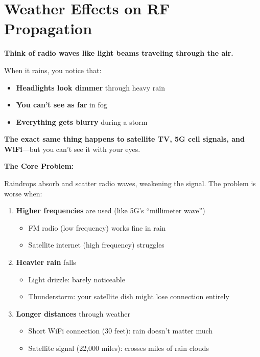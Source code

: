 \chapter{Weather Effects on RF Propagation}
\label{ch:weather-effects}

\begin{nontechnical}
\textbf{Think of radio waves like light beams traveling through the air.}

When it rains, you notice that:
\begin{itemize}
\item \textbf{Headlights look dimmer} through heavy rain
\item \textbf{You can't see as far} in fog
\item \textbf{Everything gets blurry} during a storm
\end{itemize}

\textbf{The exact same thing happens to satellite TV, 5G cell signals, and WiFi}---but you can't see it with your eyes.

\vspace{6pt}
\textbf{The Core Problem:}

Raindrops absorb and scatter radio waves, weakening the signal. The problem is worse when:
\begin{enumerate}
\item \textbf{Higher frequencies} are used (like 5G's ``millimeter wave'')
  \begin{itemize}
  \item FM radio (low frequency) works fine in rain
  \item Satellite internet (high frequency) struggles
  \end{itemize}
\item \textbf{Heavier rain} falls
  \begin{itemize}
  \item Light drizzle: barely noticeable
  \item Thunderstorm: your satellite dish might lose connection entirely
  \end{itemize}
\item \textbf{Longer distances} through weather
  \begin{itemize}
  \item Short WiFi connection (30 feet): rain doesn't matter much
  \item Satellite signal (22,000 miles): crosses miles of rain clouds
  \end{itemize}
\end{enumerate}


\end{nontechnical}
